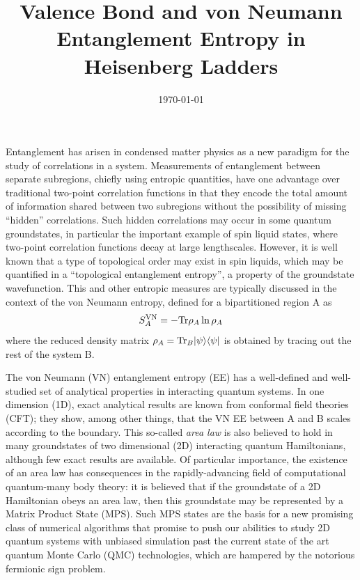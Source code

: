 \documentclass[prl,aps,twocolumn,floatfix,amsmath,amssymb,superscriptaddress,tightenlines]{revtex4}
\begin{document}
\date{\today}
\title{Valence Bond and von Neumann Entanglement Entropy in Heisenberg Ladders}


\begin{abstract}

\end{abstract}
\maketitle


Entanglement has arisen in condensed matter physics as a new paradigm for the study of correlations in a system.  Measurements of entanglement between separate subregions, chiefly using entropic quantities, have one advantage over traditional two-point correlation functions in that they encode the total amount of information shared between two subregions without the possibility of missing ``hidden'' correlations.  Such hidden correlations may occur in some quantum groundstates,  in particular the important example of spin liquid states, where two-point correlation functions decay at large lengthscales.  However, it is well known that a type of topological order may exist in spin liquids, which may be quantified in a ``topological entanglement entropy'', a property of the groundstate wavefunction.  This and other entropic measures are typically discussed in the context of the von Neumann entropy, defined for a bipartitioned region A as
\begin{equation}
S^{\rm VN}_A = - {\rm Tr} \rho_A \ln \rho_A
\end{equation}
where the reduced density matrix $\rho_A = {\rm Tr}_B | \psi \rangle \langle \psi |$ is obtained by tracing out the rest of the system B.

The von Neumann (VN) entanglement entropy (EE) has a well-defined and well-studied set of analytical properties in interacting quantum systems.  In one dimension (1D), exact analytical results are known from conformal field theories (CFT); they show, among other things, that the VN EE between A and B scales according to the boundary.  This so-called {\it area law} is also believed to hold in many groundstates of two dimensional (2D) interacting quantum Hamiltonians, although few exact results are available.  
Of particular importance, the existence of an area law has consequences in the rapidly-advancing field of computational quantum-many body theory: it is believed that if the groundstate of a 2D Hamiltonian obeys an area law, then this groundstate may be represented by a Matrix Product State (MPS).  Such MPS states are the basis for a new promising class of numerical algorithms that promise to push our abilities to study 2D quantum systems with unbiased simulation past the current state of the art quantum Monte Carlo (QMC) technologies, which are hampered by the notorious fermionic sign problem.
\end{document}
